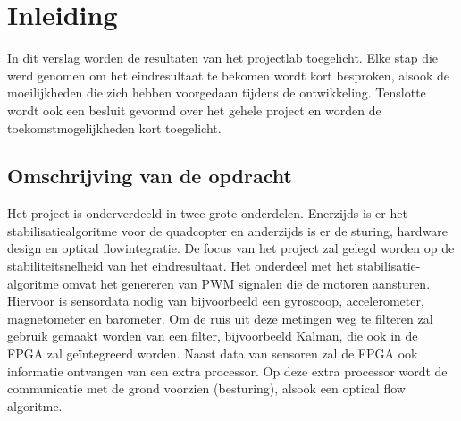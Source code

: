 \chapter{Inleiding}
	
	\par In dit verslag worden de resultaten van het projectlab toegelicht. Elke stap die werd genomen om het eindresultaat te bekomen wordt kort besproken, alsook de moeilijkheden die zich hebben voorgedaan tijdens de ontwikkeling. Tenslotte wordt ook een besluit gevormd over het gehele project en worden de toekomstmogelijkheden kort toegelicht. 

	\section{Omschrijving van de opdracht}

		\par Het project is onderverdeeld in twee grote onderdelen. Enerzijds is er het stabilisatiealgoritme voor de quadcopter en anderzijds is er de sturing, hardware design en optical flowintegratie. De focus van het project zal gelegd worden op de stabiliteitsnelheid van het eindresultaat. Het onderdeel met het stabilisatie-algoritme omvat het genereren van PWM signalen die de motoren aansturen. Hiervoor is sensordata nodig van bijvoorbeeld een gyroscoop, accelerometer, magnetometer en barometer. Om de ruis uit deze metingen weg te filteren zal gebruik gemaakt worden van een filter, bijvoorbeeld Kalman, die ook in de FPGA zal ge\"integreerd worden. Naast data van sensoren zal de FPGA ook informatie ontvangen van een extra processor. Op deze extra processor wordt de communicatie met de grond voorzien (besturing), alsook een optical flow algoritme. 

